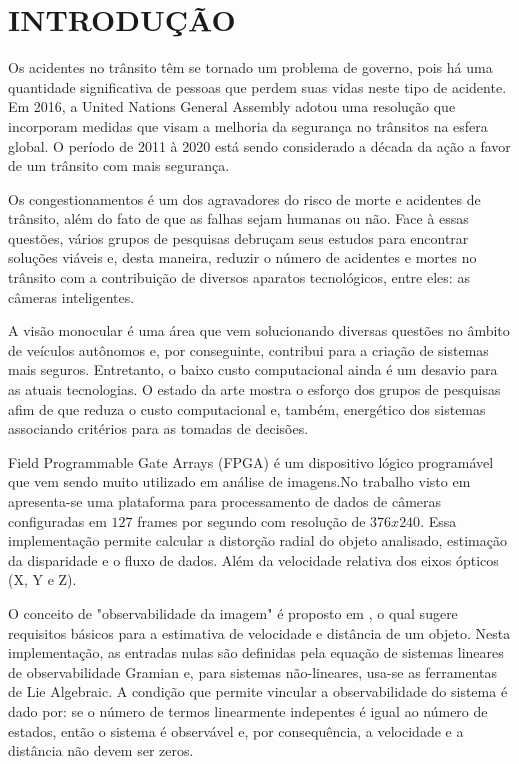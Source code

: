\section{INTRODUÇÃO}

Os acidentes no trânsito têm se tornado um problema de governo, pois há uma quantidade significativa de pessoas que
perdem suas vidas neste tipo de acidente. Em 2016, a United Nations General Assembly adotou uma resolução que incorporam medidas que visam 
a melhoria da segurança no trânsitos na esfera global. O período de 2011 à 2020 está sendo considerado a década da ação a favor
de um trânsito com mais segurança.

Os congestionamentos é um dos agravadores do risco de morte e acidentes de trânsito, além do fato de que as falhas sejam humanas ou não. 
Face à essas questões, vários grupos de pesquisas debruçam seus estudos para encontrar soluções viáveis e, desta maneira,
reduzir o número de acidentes e mortes no trânsito com a contribuição de diversos aparatos tecnológicos, entre eles: as câmeras inteligentes.

A visão monocular é uma área que vem solucionando diversas questões no âmbito de veículos autônomos e, por conseguinte, 
contribui para a criação de sistemas mais seguros. Entretanto, o baixo custo computacional ainda é um desavio 
para as atuais tecnologias. O estado da arte mostra o esforço dos grupos de pesquisas afim de que reduza o custo computacional e,
também, energético dos sistemas associando critérios para as tomadas de decisões.

Field Programmable Gate Arrays (FPGA) é um dispositivo lógico programável que vem sendo muito utilizado em análise de imagens.No trabalho visto em
\cite{Honegger}
apresenta-se uma plataforma para processamento de dados de câmeras configuradas em $127$ frames por segundo com resolução de $376x240$. Essa 
implementação permite calcular a distorção radial do objeto analisado, estimação da disparidade e o fluxo de dados. Além da 
velocidade relativa dos eixos ópticos (X, Y e Z).

O conceito de "observabilidade da imagem" é proposto em \cite{Breugel}, o qual sugere requisitos básicos para a estimativa de velocidade e 
distância de um objeto. Nesta implementação, as entradas nulas são definidas pela equação de sistemas lineares de observabilidade Gramian e,
para sistemas não-lineares, usa-se as ferramentas de Lie Algebraic. A condição que permite vincular a observabilidade do sistema é dado por:
se o número de termos linearmente indepentes é igual ao número de estados, então o sistema é observável e, por consequência, a velocidade e a 
distância não devem ser zeros.

